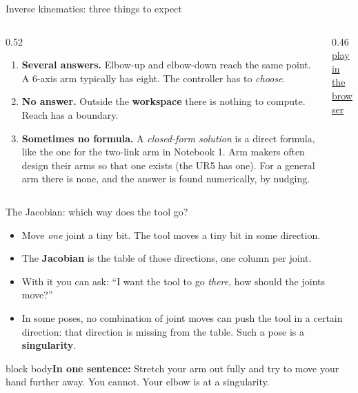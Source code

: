 \documentclass[aspectratio=169]{beamer}
\newcommand{\takeaway}[1]{\vspace{2mm}\begin{beamercolorbox}[rounded=true,sep=4pt,wd=\textwidth]{block body}\footnotesize\textbf{In one sentence:} #1\end{beamercolorbox}}
\begin{document}
\begin{frame}{Inverse kinematics: three things to expect}
	\begin{columns}[T]
		\begin{column}{0.52\textwidth}
			\begin{enumerate}\footnotesize
				\item \textbf{Several answers.} Elbow-up and elbow-down reach the same point. A 6-axis arm typically has eight. The controller has to \emph{choose}.
				\item \textbf{No answer.} Outside the \textbf{workspace} there is nothing to compute. Reach has a boundary.
				\item \textbf{Sometimes no formula.} A \emph{closed-form solution} is a direct formula, like the one for the two-link arm in Notebook 1. Arm makers often design their arms so that one exists (the UR5 has one). For a general arm there is none, and the answer is found numerically, by nudging.
			\end{enumerate}
		\end{column}
		\begin{column}{0.46\textwidth}
			\centering
			\\[0.3mm]
			{\tiny\href{https://raw.githubusercontent.com/ABC-iRobotics/advanced-robotics-project-course/main/week01_classical_robotics/slides/img/sim/ik_answers.gif}{\textcolor{blue!70!black}{play in the browser}}}
		\end{column}
	\end{columns}
\end{frame}

\begin{frame}{The Jacobian: which way does the tool go?}
	\begin{itemize}
		\item Move \emph{one} joint a tiny bit. The tool moves a tiny bit in some direction.
		\item The \textbf{Jacobian} is the table of those directions, one column per joint.
		\item With it you can ask: ``I want the tool to go \emph{there}, how should the joints move?''
		\item In some poses, no combination of joint moves can push the tool in a certain direction: that direction is missing from the table. Such a pose is a \textbf{singularity}.
	\end{itemize}
	\takeaway{Stretch your arm out fully and try to move your hand further away. You cannot. Your elbow is at a singularity.}
\end{frame}
\end{document}
